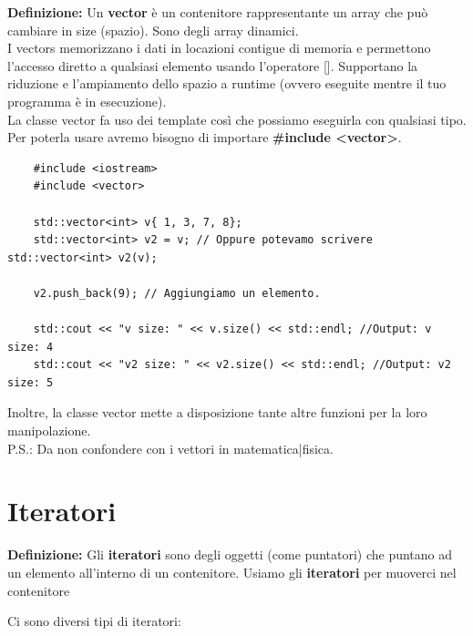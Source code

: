 \textsf{\small \textbf{Definizione:} Un \textbf{vector} è un contenitore rappresentante un array che può cambiare in size (spazio). Sono degli array dinamici.} \\

\textsf{\small I vectors memorizzano i dati in locazioni contigue di memoria e permettono l'accesso diretto a qualsiasi elemento usando l'operatore []. Supportano la riduzione e l'ampiamento dello spazio a runtime (ovvero eseguite mentre il tuo programma è in esecuzione).} \\

\textsf{\small La classe vector fa uso dei template così che possiamo eseguirla con qualsiasi tipo. Per poterla usare avremo bisogno di importare \textbf{\#include <vector>}.} \\

\begin{lstlisting}
	#include <iostream>
	#include <vector>
	
	std::vector<int> v{ 1, 3, 7, 8};
	std::vector<int> v2 = v; // Oppure potevamo scrivere std::vector<int> v2(v);
	
	v2.push_back(9); // Aggiungiamo un elemento.
	
	std::cout << "v size: " << v.size() << std::endl; //Output: v size: 4
	std::cout << "v2 size: " << v2.size() << std::endl; //Output: v2 size: 5
\end{lstlisting}

\textsf{\small Inoltre, la classe vector mette a disposizione tante altre funzioni per la loro manipolazione.} \\

\textsf{\small P.S.: Da non confondere con i vettori in matematica|fisica.} \break


\newpage

\section{Iteratori}

\textsf{\small \textbf{Definizione: } Gli \textbf{iteratori} sono degli oggetti (come puntatori) che puntano ad un elemento all'interno di un contenitore. Usiamo gli \textbf{iteratori} per muoverci nel contenitore } \break

\textsf{\small Ci sono diversi tipi di iteratori: }

